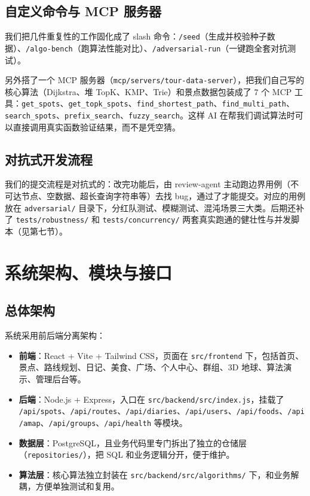 \documentclass[UTF8,a4paper,12pt]{ctexart}
\begin{document}
\subsection{自定义命令与 MCP 服务器}
我们把几件重复性的工作固化成了 slash 命令：\texttt{/seed}（生成并校验种子数据）、\texttt{/algo-bench}（跑算法性能对比）、\texttt{/adversarial-run}（一键跑全套对抗测试）。

另外搭了一个 MCP 服务器（\texttt{mcp/servers/tour-data-server}），把我们自己写的核心算法（Dijkstra、堆 TopK、KMP、Trie）和景点数据包装成了 7 个 MCP 工具：\texttt{get\_spots}、\texttt{get\_topk\_spots}、\texttt{find\_shortest\_path}、\texttt{find\_multi\_path}、\texttt{search\_spots}、\texttt{prefix\_search}、\texttt{fuzzy\_search}。这样 AI 在帮我们调试算法时可以直接调用真实函数验证结果，而不是凭空猜。

\subsection{对抗式开发流程}
我们的提交流程是对抗式的：改完功能后，由 review-agent 主动跑边界用例（不可达节点、空数据、超长查询字符串等）去找 bug，通过了才能提交。对应的用例放在 \texttt{adversarial/} 目录下，分红队测试、模糊测试、混沌场景三大类。后期还补了 \texttt{tests/robustness/} 和 \texttt{tests/concurrency/} 两套真实跑通的健壮性与并发脚本（见第七节）。

\section{系统架构、模块与接口}

\subsection{总体架构}
系统采用前后端分离架构：

\begin{itemize}
\item \textbf{前端}：React + Vite + Tailwind CSS，页面在 \texttt{src/frontend} 下，包括首页、景点、路线规划、日记、美食、广场、个人中心、群组、3D 地球、算法演示、管理后台等。
\item \textbf{后端}：Node.js + Express，入口在 \texttt{src/backend/src/index.js}，挂载了 \texttt{/api/spots}、\texttt{/api/routes}、\texttt{/api/diaries}、\texttt{/api/users}、\texttt{/api/foods}、\texttt{/api/amap}、\texttt{/api/groups}、\texttt{/api/health} 等模块。
\item \textbf{数据层}：PostgreSQL，且业务代码里专门拆出了独立的仓储层（\texttt{repositories/}），把 SQL 和业务逻辑分开，便于维护。
\item \textbf{算法层}：核心算法独立封装在 \texttt{src/backend/src/algorithms/} 下，和业务解耦，方便单独测试和复用。
\end{itemize}
\end{document}
